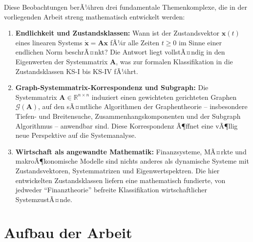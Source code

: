 ﻿\documentclass[12pt, a4paper, titlepage]{report}
\theoremstyle{definition}
\theoremstyle{remark}
\newcommand{\R}{\mathbb{R}}
\newcommand{\vx}{\bm{x}}
\newcommand{\vA}{\bm{A}}
\begin{document}
Diese Beobachtungen berÃ¼hren drei fundamentale Themenkomplexe, die in der vorliegenden
Arbeit streng mathematisch entwickelt werden:

\begin{enumerate}[label=(\roman*)]
  \item \textbf{Endlichkeit und Zustandsklassen:} Wann ist der Zustandsvektor
    $\vx(t)$ eines linearen Systems $\dot{\vx} = \vA\vx$ fÃ¼r alle Zeiten $t \geq 0$
    im Sinne einer endlichen Norm beschrÃ¤nkt? Die Antwort liegt vollstÃ¤ndig in den
    Eigenwerten der Systemmatrix $\vA$, was zur formalen Klassifikation in die
    Zustandsklassen KS-I bis KS-IV fÃ¼hrt.

  \item \textbf{Graph-Systemmatrix-Korrespondenz und Subgraph:} Die Systemmatrix
    $\vA \in \R^{n \times n}$ induziert einen gewichteten gerichteten Graphen
    $\mathcal{G}(\vA)$, auf den sÃ¤mtliche Algorithmen der Graphentheorie -- insbesondere
    Tiefen- und Breitensuche, Zusammenhangskomponenten und der Subgraph Algorithmus --
    anwendbar sind. Diese Korrespondenz Ã¶ffnet eine vÃ¶llig neue Perspektive auf die
    Systemanalyse.

  \item \textbf{Wirtschaft als angewandte Mathematik:} Finanzsysteme, MÃ¤rkte und
    makroÃ¶konomische Modelle sind nichts anderes als dynamische Systeme mit
    Zustandsvektoren, Systemmatrizen und Eigenwertspektren. Die hier entwickelten
    Zustandsklassen liefern eine mathematisch fundierte, von jedweder
    ``Finanztheorie'' befreite Klassifikation wirtschaftlicher SystemzustÃ¤nde.
\end{enumerate}

\section{Aufbau der Arbeit}
\end{document}
